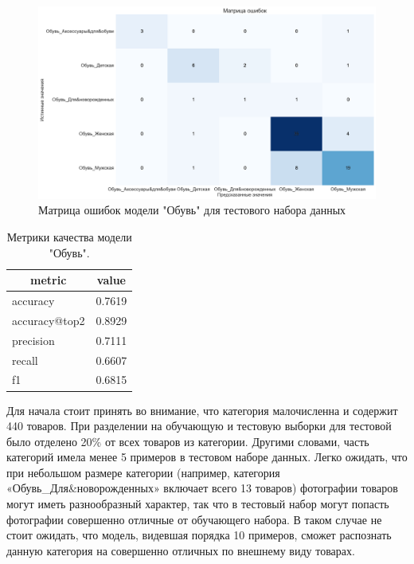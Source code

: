 \documentclass[a4paper,12pt]{extarticle}
\begin{document}
\begin{figure}[ht]
	\centering
	\includegraphics[scale=0.4]{confusion_matrix_shoes.png}
	\caption{Матрица ошибок модели "Обувь" для тестового набора данных}
	\label{fig:confusion_matrix_shoes}
\end{figure}

\begin{table}[ht]
	\caption{Метрики качества модели "Обувь".}
	\label{table:metrics_shoes}
	\footnotesize
	\centering
	\begin{tabular}{l|l}
		\toprule
		\multicolumn{1}{c|}{metric} & \multicolumn{1}{c}{value}\\
		\midrule
		accuracy      & 0.7619\\
		accuracy@top2 & 0.8929\\
		precision     & 0.7111\\
		recall        & 0.6607\\
		f1            & 0.6815\\
		\bottomrule
	\end{tabular}
\end{table}


Для начала стоит принять во внимание, что категория малочисленна и содержит 440 товаров. При разделении на обучающую и тестовую выборки для тестовой было отделено 20\% от всех товаров из категории. Другими словами, часть категорий имела менее 5 примеров в тестовом наборе данных. Легко ожидать, что при небольшом размере категории (например, категория «Обувь\_Для\&новорожденных» включает всего 13 товаров) фотографии товаров могут иметь разнообразный характер, так что в тестовый набор могут попасть фотографии совершенно отличные от обучающего набора. В таком случае не стоит ожидать, что модель, видевшая порядка 10 примеров, сможет распознать данную категория на совершенно отличных по внешнему виду товарах.
\end{document}
